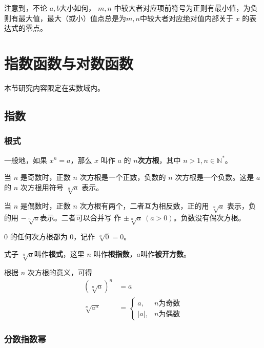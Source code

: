 \documentclass[a4paper,openany]{ctexbook}
\begin{document}
注意到，不论 \(a,b\)大小如何， %
\(m,n\) 中较大者对应项前符号为正则有最小值，为负则有最大值，最大（或小）值点总是为\(m,n\)中较大者对应绝对值内部关于 \(x\) 的表达式的零点。

\section{指数函数与对数函数}

本节研究内容限定在实数域内。

\subsection{指数}

\subsubsection{根式}

一般地，如果 \(x^n=a\)，那么 \(x\) 叫作 \(a\) 的 \textbf{\(n\)次方根}，其中 \(n>1,n \in \mathbb{N} ^*\)。

当 \(n\) 是奇数时，正数 \(n\) 次方根是一个正数，负数的 \(n\) 次方根是一个负数。这是 \(a\) 的 \(n\) 次方根用符号 \(\sqrt[n]{a}\) 表示。

当 \(n\) 是偶数时，正数 \(n\) 次方根有两个，二者互为相反数，正的用 \(\sqrt[n]{a}\) 表示，负的用 \(-\sqrt[n]{a}\)表示。二者可以合并写
作 \(\pm \sqrt[n]{a}\ (a>0)\)。负数没有偶次方根。

\(0\) 的任何次方根都为 \(0\)，记作 \(\sqrt[n]{0}=0\)。

式子 \(\sqrt[n]{a}\)叫作\textbf{根式}，这里 \(n\) 叫作\textbf{根指数}，\(a\)叫作\textbf{被开方数}。

根据 \(n\) 次方根的意义，可得
\begin{align*}
    (\sqrt[n]{a})^n & =a                     \\
    \sqrt[n]{a^n}   & =\begin{cases}
                           a,   & n \text{为奇数} \\
                           |a|, & n\text{为偶数}
                       \end{cases}
\end{align*}

\subsubsection{分数指数幂}
\end{document}
